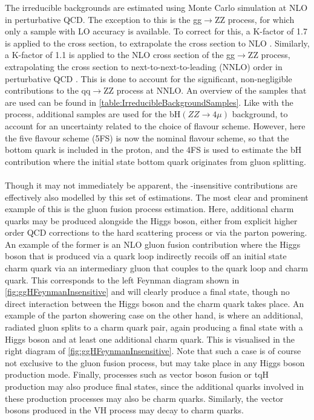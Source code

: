\noindent The irreducible backgrounds are estimated using Monte Carlo simulation at NLO in perturbative QCD. The exception to this is the gg$\rightarrow$ZZ process, for which only a sample with LO accuracy is available. To correct for this, a K-factor of 1.7 is applied to the cross section, to extrapolate the cross section to NLO \cite{qqZZkFactor}. Similarly, a K-factor of 1.1 is applied to the NLO cross section of the gg$\rightarrow$ZZ process, extrapolating the cross section to next-to-next-to-leading (NNLO) order in perturbative QCD \cite{ggZZkFactor}. This is done to account for the significant, non-negligible contributions to the qq$\rightarrow$ZZ process at NNLO. An overview of the samples that are used can be found in \autoref{table:IrreducibleBackgroundSamples}. Like with the \cHZZsen process, additional samples are used for the bH$(ZZ\rightarrow 4\mu)$ background, to account for an uncertainty related to the choice of flavour scheme. However, here the five flavour scheme (5FS) is now the nominal flavour scheme, so that the bottom quark is included in the proton, and the 4FS is used to estimate the bH contribution where the initial state bottom quark originates from gluon splitting.\\
\\
Though it may not immediately be apparent, the \kappac-insensitive \cHZZ contributions are effectively also modelled by this set of estimations. The most clear and prominent example of this is the gluon fusion process estimation. Here, additional charm quarks may be produced alongside the Higgs boson, either from explicit higher order QCD corrections to the hard scattering process or via the parton powering. An example of the former is an NLO gluon fusion contribution where the Higgs boson that is produced via a quark loop indirectly recoils off an initial state charm quark via an intermediary gluon that couples to the quark loop and charm quark. This corresponds to the left Feynman diagram shown in \autoref{fig:ggHFeynmanInsensitive} and will clearly produce a \cHZZ final state, though no direct interaction between the Higgs boson and the charm quark takes place. An example of the parton showering case on the other hand, is where an additional, radiated gluon splits to a charm quark pair, again producing a final state with a Higgs boson and at least one additional charm quark. This is visualised in the right diagram of \autoref{fig:ggHFeynmanInsensitive}. Note that such a case is of course not exclusive to the gluon fusion process, but may take place in any Higgs boson production mode. Finally, processes such as vector boson fusion or tqH production may also produce \cHZZ final states, since the additional quarks involved in these production processes may also be charm quarks. Similarly, the vector bosons produced in the VH process may decay to charm quarks.\\
